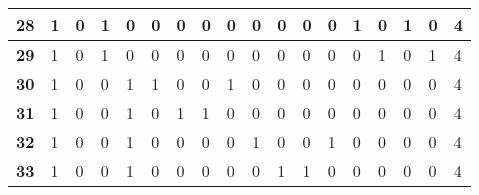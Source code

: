 \begin{table}[]
{\begin{tabular}{|P{0.6cm}|P{0.65cm}|P{0.65cm}|P{0.65cm}|P{0.65cm}|P{0.65cm}|P{0.65cm}|P{0.65cm}|P{0.65cm}|P{0.65cm}|P{0.65cm}|P{0.65cm}|P{0.65cm}|P{0.65cm}|P{0.65cm}|P{0.65cm}|P{0.65cm}|P{2.9cm}|}
\textbf{28}                        & 1                     & 0                     & 1                     & 0                     & 0                     & 0                     & 0                     & 0                     & 0                     & 0                     & 0                     & 0                     & 1                     & 0                     & 1                     & 0                     & 4                     \\ \hline
\textbf{29}                        & 1                     & 0                     & 1                     & 0                     & 0                     & 0                     & 0                     & 0                     & 0                     & 0                     & 0                     & 0                     & 0                     & 1                     & 0                     & 1                     & 4                     \\ \hline
\textbf{30}                        & 1                     & 0                     & 0                     & 1                     & 1                     & 0                     & 0                     & 1                     & 0                     & 0                     & 0                     & 0                     & 0                     & 0                     & 0                     & 0                     & 4                     \\ \hline
\textbf{31}                        & 1                     & 0                     & 0                     & 1                     & 0                     & 1                     & 1                     & 0                     & 0                     & 0                     & 0                     & 0                     & 0                     & 0                     & 0                     & 0                     & 4                     \\ \hline
\textbf{32}                        & 1                     & 0                     & 0                     & 1                     & 0                     & 0                     & 0                     & 0                     & 1                     & 0                     & 0                     & 1                     & 0                     & 0                     & 0                     & 0                     & 4                     \\ \hline
\textbf{33}                        & 1                     & 0                     & 0                     & 1                     & 0                     & 0                     & 0                     & 0                     & 0                     & 1                     & 1                     & 0                     & 0                     & 0                     & 0                     & 0                     & 4                     \\ \hline

\end{tabular}}
\end{table}
